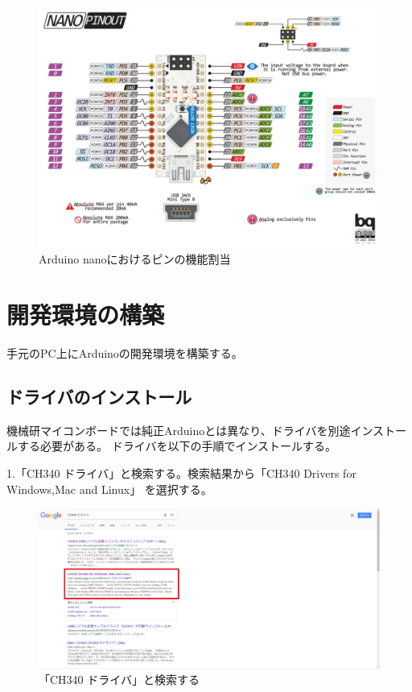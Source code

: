 \documentclass[uplatex]{jsarticle}
\begin{document}
\begin{figure}[htbp]
    \centering
     \includegraphics[width=15cm]{nano.jpg}
    \caption{Arduino nanoにおけるピンの機能割当}
\end{figure}

\section{開発環境の構築}
手元のPC上にArduinoの開発環境を構築する。
\subsection{ドライバのインストール}
機械研マイコンボードでは純正Arduinoとは異なり、ドライバを別途インストールする必要がある。
ドライバを以下の手順でインストールする。

1.「CH340 ドライバ」と検索する。検索結果から「CH340 Drivers for Windows,Mac and Linux」
を選択する。
\begin{figure}[htbp]
    \centering
     \includegraphics[width=13cm]{driver_1.png}
    \caption{「CH340 ドライバ」と検索する}
\end{figure}
\end{document}
